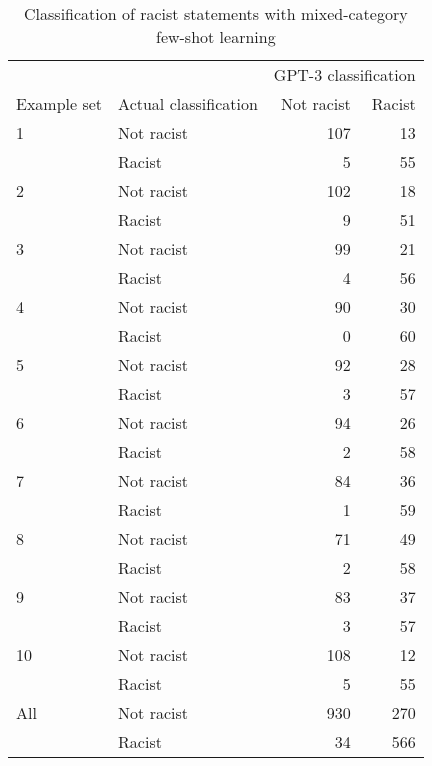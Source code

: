 \documentclass{bmcart}
\begin{document}
\begin{backmatter}
\begin{table}[!h]
\caption{\label{tab:fewshotmixed-racism}Classification of racist statements with mixed-category few-shot learning}
\centering
\fontsize{8}{10}\selectfont
\begin{tabular}[t]{llrr}
\hline
\multicolumn{2}{c}{ } & \multicolumn{2}{c}{GPT-3 classification} \\
Example set & Actual classification & Not racist & Racist\\
\hline
1 & Not racist & 107 & 13\\
 & Racist & 5 & 55\\
\hline
2 & Not racist & 102 & 18\\
 & Racist & 9 & 51\\
\hline
3 & Not racist & 99 & 21\\
 & Racist & 4 & 56\\
\hline
4 & Not racist & 90 & 30\\
 & Racist & 0 & 60\\
\hline
5 & Not racist & 92 & 28\\
 & Racist & 3 & 57\\
\hline
6 & Not racist & 94 & 26\\
 & Racist & 2 & 58\\
\hline
7 & Not racist & 84 & 36\\
 & Racist & 1 & 59\\
\hline
8 & Not racist & 71 & 49\\
 & Racist & 2 & 58\\
\hline
9 & Not racist & 83 & 37\\
 & Racist & 3 & 57\\
\hline
10 & Not racist & 108 & 12\\
 & Racist & 5 & 55\\
\hline
All & Not racist & 930 & 270\\
 & Racist & 34 & 566\\
\hline
\end{tabular}
\end{table}

\begin{table}[!h]


\end{table}
\end{backmatter}
\end{document}
